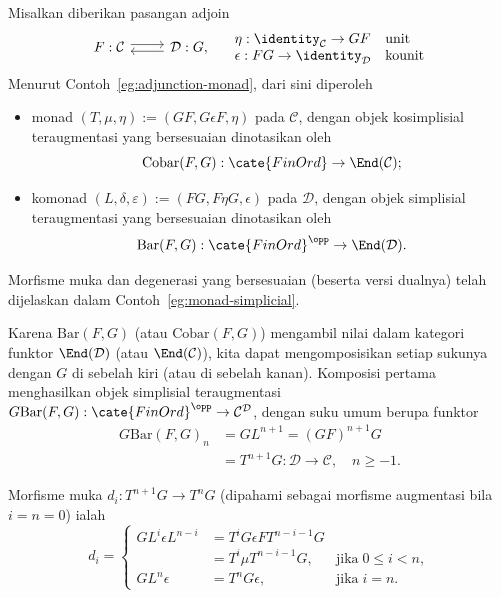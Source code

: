 \begin{example}\label{eg:bar-adjunction}
	Misalkan diberikan pasangan adjoin
	\[\begin{tikzcd}
		F : \mathcal{C} \arrow[shift left, r] & \mathcal{D}: G \arrow[shift left, l] ,
	\end{tikzcd} \quad \begin{array}{ll}
		\eta: \identity_{\mathcal{C}} \to GF & \text{unit} \\
		\epsilon: FG \to \identity_{\mathcal{D}} & \text{kounit}
	\end{array}\]
	Menurut Contoh~\ref{eg:adjunction-monad}, dari sini diperoleh
	\begin{itemize}
		\item monad $(T,\mu,\eta):=(GF,G\epsilon F,\eta)$ pada
		$\mathcal{C}$, dengan objek kosimplisial teraugmentasi yang
		bersesuaian dinotasikan oleh
		\[ \mathrm{Cobar}(F, G): \cate{FinOrd} \to \End(\mathcal{C}); \]
		\item komonad $(L,\delta,\varepsilon):=(FG,F\eta G,\epsilon)$ pada
		$\mathcal{D}$, dengan objek simplisial teraugmentasi yang
		bersesuaian dinotasikan oleh
		\[ \mathrm{Bar}(F, G): \cate{FinOrd}^{\opp} \to \End(\mathcal{D}). \]
	\end{itemize}
	Morfisme muka dan degenerasi yang bersesuaian (beserta versi dualnya)
	telah dijelaskan dalam Contoh~\ref{eg:monad-simplicial}.

	Karena $\mathrm{Bar}(F,G)$ (atau $\mathrm{Cobar}(F,G)$) mengambil nilai
	dalam kategori funktor $\End(\mathcal{D})$ (atau
	$\End(\mathcal{C})$), kita dapat mengomposisikan setiap sukunya dengan
	$G$ di sebelah kiri (atau di sebelah kanan). Komposisi pertama
	menghasilkan objek simplisial teraugmentasi
	$G\mathrm{Bar}(F,G):\cate{FinOrd}^{\opp}\to
	\mathcal{C}^{\mathcal{D}}$, dengan suku umum berupa funktor
	\begin{align*}
		G\mathrm{Bar}(F, G)_n & = GL^{n+1} = (GF)^{n+1} G \\
		& = T^{n+1}G: \mathcal{D} \to \mathcal{C}, \quad n \geq -1.
	\end{align*}

	Morfisme muka $d_i:T^{n+1}G\to T^nG$ (dipahami sebagai morfisme
	augmentasi bila $i=n=0$) ialah
	\[d_i = \left\{\begin{array}{rll}
		G L^i \epsilon L^{n-i} & = T^i G \epsilon F T^{n-i-1} G & \\
		& = T^i \mu T^{n-i-1} G, & \text{jika}\; 0 \leq i < n, \\
		G L^n \epsilon & = T^n G \epsilon , & \text{jika}\; i = n.
	\end{array}\right.\]


\end{example}
